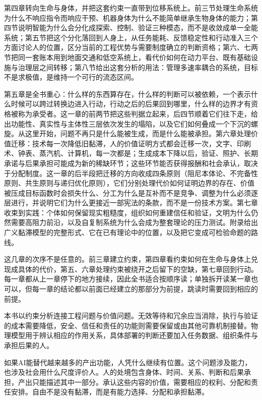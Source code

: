第四章转向生命与身体，并把这套约束一直带到位移系统上。前三节处理生命系统为什么不响应指令而响应干预、机器身体为什么不能简单继承生物身体的能力；第四节说明智能为什么会分化成探索、控制、验证三种模态，而不是收敛成单一全能系统；第五节把这个分化落回到人身上，从任务能耗、反馈稳定性和行动准入三个方面讨论人的位置，区分当前的工程优势与需要制度确立的判断资格；第六、七两节把同一套账本用到地面交通和低空系统上，看代价如何在动力平台、既有基础设施与治理层之间转移；第八节给出这套分析的用法：管理多速率耦合的系统，目标不是求极值，是维持一个可行的流态区间。

第五章是全书重心：什么样的东西算存在，什么样的判断可以被依赖，一个表示什么时候可以跨过转换边进入行动，行动之后的后果回到哪里，什么样的边界才有资格被称为承受者。这一章的前两节把这些判据立起来，后四节顺着它们往下走，给出功能性、真实性与主体性三层依次发生的塌陷，以及它们如何叠成一个下沉的螺旋。从这里开始，问题不再只是什么能被生成，而是什么能被承担。第六章处理价值迁移：技术每一次降低旧黏滞，人的价值证明方式都会迁移一次，文字、印刷术、钟表、蒸汽机、计算机，每一次都是；生成成本下降以后，验证、照护、长期承诺与后果承担可能成为新的稀缺环节；这些环节能否获得报酬和社会承认，取决于分配制度。这一章的后半段把迁移的方向收成四条原则（阻尼本体论、不完备性原则、共生原则与递归优化原则），它们分别处理代价如何证明边界的存在、价值被压成目标函数时会损失什么、分工为什么是互补而不是竞争、调整为什么必须逐层进行，并说明它们为什么更接近一部宪法的条款，而不是一份技术方案。第七章收束到实践：个体如何保留现实粗糙度，组织如何重建信任和验证，文明为什么仍然需要高阻力前沿，以及自复制系统为什么会成为整套理论的压力测试。附录给出广义黏滞模型的完整形式、它在已有理论中的位置，以及把它变成可检验命题的路线。

这几章的次序不是任意的。前三章建立约束，第四章看约束如何在生命与身体上兑现成具体的代价，第五、六章处理约束被绕开之后留下的空缺，第七章回到行动。每一章都从上一章停下的地方接续，因此全书适合按顺序读；单独拆开读某一章也可以，但每一章的结论都以前面已经建立的那部分为前提，跳读时需要回到相应的前提。

本书以约束分析连接工程问题与价值问题。无效等待和冗余应当消除，执行与验证的成本需要降低，安全、信任和责任的功能则需要保留或由其他可靠机制接替。物理模型用于辨认相应的作用关系，具体部署的判断还要加入任务数据、组织条件与承担后果的人。

如果AI能替代越来越多的产出功能，人凭什么继续有位置。这个问题涉及能力，也涉及社会用什么尺度评价人。人的处境包含身体、时间、关系、判断和后果承担，产出只能描述其中一部分。承认这些内容的价值，需要相应的权利、分配和责任安排。自由不是没有黏滞，而是有能力选择、分配和承担黏滞。
